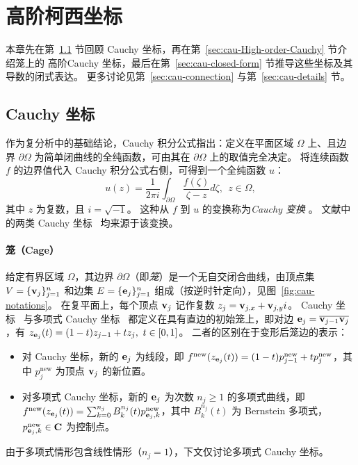\section{高阶柯西坐标} \label{sec:cau-method}
本章先在第~\ref{sec:cau-revisit} 节回顾 Cauchy 坐标，再在第~\ref{sec:cau-High-order-Cauchy} 节介绍笼上的 高阶Cauchy 坐标，最后在第~\ref{sec:cau-closed-form} 节推导这些坐标及其导数的闭式表达。
%
更多讨论见第~\ref{sec:cau-connection} 与第~\ref{sec:cau-details} 节。

\subsection{ Cauchy 坐标}\label{sec:cau-revisit}
作为复分析中的基础结论，Cauchy 积分公式指出：定义在平面区域 \(\Omega\) 上、且边界 $\partial \Omega$ 为简单闭曲线的全纯函数，可由其在 $\partial \Omega$ 上的取值完全决定。
%
将连续函数 \(f\) 的边界值代入 Cauchy 积分公式右侧，可得到一个全纯函数 \(u\)：
\begin{equation}\label{equ:cau-Cauchy-integral}
    u(z)=\frac{1}{2\pi i}\int_{\partial \Omega}\frac{f(\zeta)}{\zeta-z} d\zeta,\ \ z \in \Omega,
\end{equation}
其中 $z$ 为复数，且 \(i=\sqrt{-1}\)。
这种从 \(f\) 到 \(u\) 的变换称为\emph{Cauchy 变换} \cite{Bell2015cauchytransform}。
文献中的两类 Cauchy 坐标~\cite{Weber2009,Lin2024PolynomialCC} 均来源于该变换。

\paragraph{笼（Cage）}
给定有界区域 $\Omega$，其边界 $\partial \Omega$（即\emph{笼}）是一个无自交闭合曲线，由顶点集 $V = \{\mathbf{v}_j\}^n_{j=1}$ 和边集 $E = \{\mathbf{e}_j\}^n_{j=1}$ 组成（按逆时针定向），见图~\ref{fig:cau-notations}。
%
在复平面上，每个顶点 $\mathbf{v}_j$ 记作复数 \(z_j=\mathbf{v}_{j,x}+\mathbf{v}_{j,y} i\)。
%
Cauchy 坐标~\cite{Weber2009} 与多项式 Cauchy 坐标~\cite{Lin2024PolynomialCC} 都定义在具有直边的初始笼上，即对边 $\mathbf{e}_j = \overline{\mathbf{v}_{j-1}\mathbf{v}_j}$，有 \( z_{\me_j}(t) = (1-t) z_{j-1} + t z_j,\ t\in[0,1]\)。
二者的区别在于变形后笼边的表示：
\begin{itemize}
    \item 对 Cauchy 坐标，新的 $\mathbf{e}_j$ 为线段，即 $f^\text{new}(z_{\mathbf{e}_j}(t)) = (1-t) p^\text{new}_{j-1}+t p^\text{new}_{j}$，其中 $p^\text{new}_{j}$ 为顶点 $\mathbf{v}_j$ 的新位置。
    \item 对多项式 Cauchy 坐标，新的 $\mathbf{e}_j$ 为次数 $n_j \geq 1$ 的多项式曲线，即 $f^\text{new}(z_{\mathbf{e}_j}(t)) = \sum_{k=0}^{n_j} B^{n_j}_k(t) p^\text{new}_{\mathbf{e}_j,k}$，其中 $B^{n_j}_k (t)$ 为 Bernstein 多项式，$p^\text{new}_{\mathbf{e}_j,k} \in \mathbf{C}$ 为控制点。
\end{itemize}
由于多项式情形包含线性情形（$n_j = 1$），下文仅讨论多项式 Cauchy 坐标。

